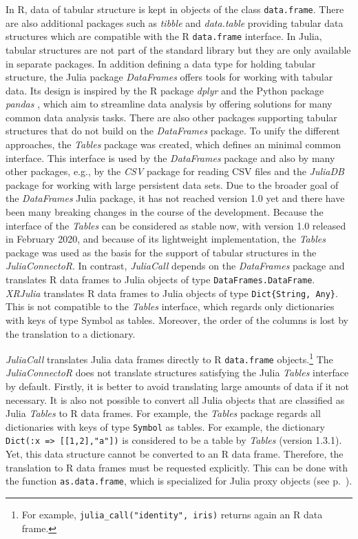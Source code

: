 \documentclass[12pt]{article}
\newcommand{\inlinecode}[1]{\texttt{#1}}
\newcommand{\apkg}[1]{\emph{#1}}
\begin{document}
In R, data of tabular structure is kept in objects of the class \inlinecode{data.frame}.
There are also additional packages such as \apkg{tibble} \citep{tibble} and \apkg{data.table} \citep{datatable} providing tabular data structures which are compatible with the R \inlinecode{data.frame} interface.
In Julia, tabular structures are not part of the standard library but they are only available in separate packages.
In addition defining a data type for holding tabular structure, the Julia package \apkg{DataFrames} \citep{juliaDataFramesGithub} offers tools for working with tabular data.
Its design is inspired by the R package \apkg{dplyr} \citep{dplyr} and the Python package \apkg{pandas} \citep{pandas}, which aim to streamline data analysis by offering solutions for many common data analysis tasks.
There are also other packages supporting tabular structures that do not build on the \apkg{DataFrames} package.
To unify the different approaches, the \apkg{Tables} package was created, which defines an minimal common interface.
This interface is used by the \apkg{DataFrames} package and also by many other packages, e.g., by the \apkg{CSV} \citep{juliacsvGithub} package for reading CSV files and the \apkg{JuliaDB} package \citep{juliadbGithub} for working with large persistent data sets.
Due to the broader goal of the \apkg{DataFrames} Julia package, it has not reached version 1.0 yet and there have been many breaking changes in the course of the development.
Because the interface of the \apkg{Tables} can be considered as stable now, with version 1.0 released in February 2020, and because of its lightweight implementation, the \apkg{Tables} package was used as the basis for the support of tabular structures in the \apkg{JuliaConnectoR}.
In contrast, \apkg{JuliaCall} depends on the \apkg{DataFrames} package and translates R data frames to Julia objects of type \inlinecode{DataFrames.DataFrame}.
\apkg{XRJulia} translates R data frames to Julia objects of type \inlinecode{Dict\{String, Any\}}.
This is not compatible to the \apkg{Tables} interface, which regards only dictionaries with keys of type {Symbol} as tables.
Moreover, the order of the columns is lost by the translation to a dictionary.

\apkg{JuliaCall} translates Julia data frames directly to R \inlinecode{data.frame} objects.\footnote{For example, \inlinecode{julia\_call("identity", iris)} returns again an R data frame.}
The \apkg{JuliaConnectoR} does not translate structures satisfying the Julia \apkg{Tables} interface by default.
Firstly, it is better to avoid translating large amounts of data if it not necessary.
It is also not possible to convert all Julia objects that are classified as Julia \apkg{Tables} to R data frames.
For example, the \apkg{Tables} package regards all dictionaries with keys of type \inlinecode{Symbol} as tables.
For example, the dictionary \inlinecode{Dict(:x => [[1,2],"a"])} is considered to be a table by \apkg{Tables} (version 1.3.1).
Yet, this data structure cannot be converted to an R data frame.
Therefore, the translation to R data frames must be requested explicitly.
This can be done with the function \inlinecode{as.data.frame}, which is specialized for Julia proxy objects (see p.~\pageref{rdokitem_as.data.frame.JuliaProxy}).
\end{document}
